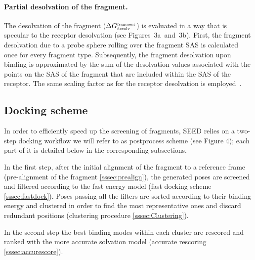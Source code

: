 \documentclass[a4paper,12pt,titlepage]{article}
\begin{document}
\paragraph{Partial desolvation of the fragment.}

The desolvation of the fragment 
($\Delta G^{\mbox{\tiny fragment}}_{\mbox{\tiny desolv}}$) 
is evaluated in a way that is specular to the 
receptor desolvation (see Figures~3a~and~3b). First, the fragment desolvation 
due to a probe sphere rolling over the fragment SAS is calculated once for 
every fragment type. Subsequently, the fragment desolvation upon binding is 
approximated by the sum of the desolvation values associated with the points 
on the SAS of the fragment that are included within the SAS of the receptor. 
The same scaling factor as for the receptor desolvation is employed~\cite{Majeux:Efficient}. 


\subsection{Docking scheme}
\label{ssec:Docking}


In order to efficiently speed up the screening of fragments, SEED relies on a two-step docking 
workflow we will refer to as postprocess scheme (see Figure 4); each part of it is detailed
below in the corresponding subsections.

\par In the first step, after the initial alignment of the fragment to a reference frame (pre-alignment of the fragment \ref{sssec:prealign}), 
the generated poses are screened and filtered according to the fast energy model 
(fast docking scheme \ref{sssec:fastdock}). Poses passing all the filters are 
sorted according to their
binding energy and clustered in order to find the most representative ones and discard redundant 
positions (clustering procedure \ref{sssec:Clustering}). 
\par In the second step the best binding modes within each cluster 
are rescored and ranked with the more accurate solvation model (accurate rescoring \ref{sssec:accurescore}).
\end{document}
